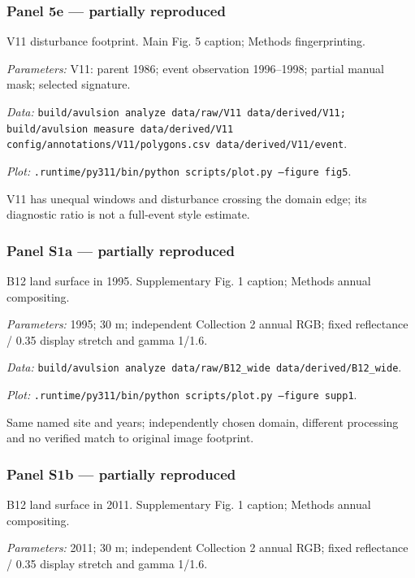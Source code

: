\subsubsection*{Panel 5e --- partially reproduced}
V11 disturbance footprint. Main Fig. 5 caption; Methods fingerprinting.

\textit{Parameters:} V11: parent 1986; event observation 1996--1998; partial manual mask; selected signature.

\textit{Data:} \texttt{build/\allowbreak{}avulsion analyze data/\allowbreak{}raw/\allowbreak{}V11 data/\allowbreak{}derived/\allowbreak{}V11; build/\allowbreak{}avulsion measure data/\allowbreak{}derived/\allowbreak{}V11 config/\allowbreak{}annotations/\allowbreak{}V11/\allowbreak{}polygons.csv data/\allowbreak{}derived/\allowbreak{}V11/\allowbreak{}event}.

\textit{Plot:} \texttt{.runtime/\allowbreak{}py311/\allowbreak{}bin/\allowbreak{}python scripts/\allowbreak{}plot.py --figure fig5}.

V11 has unequal windows and disturbance crossing the domain edge; its diagnostic ratio is not a full-event style estimate.

\subsubsection*{Panel S1a --- partially reproduced}
B12 land surface in 1995. Supplementary Fig. 1 caption; Methods annual compositing.

\textit{Parameters:} 1995; 30 m; independent Collection 2 annual RGB; fixed reflectance / 0.35 display stretch and gamma 1/1.6.

\textit{Data:} \texttt{build/\allowbreak{}avulsion analyze data/\allowbreak{}raw/\allowbreak{}B12\_wide data/\allowbreak{}derived/\allowbreak{}B12\_wide}.

\textit{Plot:} \texttt{.runtime/\allowbreak{}py311/\allowbreak{}bin/\allowbreak{}python scripts/\allowbreak{}plot.py --figure supp1}.

Same named site and years; independently chosen domain, different processing and no verified match to original image footprint.

\subsubsection*{Panel S1b --- partially reproduced}
B12 land surface in 2011. Supplementary Fig. 1 caption; Methods annual compositing.

\textit{Parameters:} 2011; 30 m; independent Collection 2 annual RGB; fixed reflectance / 0.35 display stretch and gamma 1/1.6.


